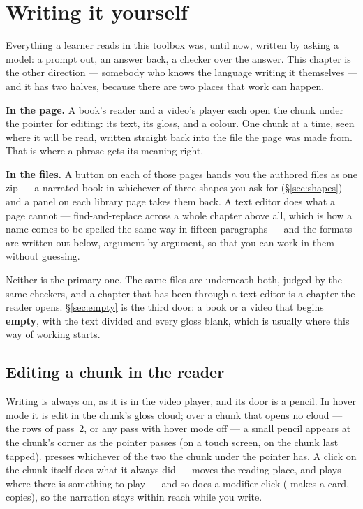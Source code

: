 \documentclass[11pt,oneside]{report}
\newcommand{\key}[1]{\textsf{\small\fbox{#1}}}
\newcommand{\menu}[1]{\textsf{#1}}
\begin{document}
\chapter{Writing it yourself}
\label{ch:writing}

Everything a learner reads in this toolbox was, until now, written by asking a
model: a prompt out, an answer back, a checker over the answer. This chapter
is the other direction --- somebody who knows the language writing it
themselves --- and it has two halves, because there are two places that work
can happen.

\textbf{In the page.} A book's reader and a video's player each open the chunk
under the pointer for editing: its text, its gloss, and a colour. One chunk at
a time, seen where it will be read, written straight back into the file the
page was made from. That is where a phrase gets its meaning right.

\textbf{In the files.} A button on each of those pages hands you the authored
files as one zip --- a narrated book in whichever of three shapes you ask for
(\S\ref{sec:shapes}) --- and a panel on each library page takes them back. A text
editor does what a page cannot --- find-and-replace across a whole chapter
above all, which is how a name comes to be spelled the same way in fifteen
paragraphs --- and the formats are written out below, argument by argument, so
that you can work in them without guessing.

Neither is the primary one. The same files are underneath both, judged by the
same checkers, and a chapter that has been through a text editor is a chapter
the reader opens. \S\ref{sec:empty} is the third door: a book or a video that
begins \textbf{empty}, with the text divided and every gloss blank, which is
usually where this way of working starts.

\section{Editing a chunk in the reader}
\label{sec:editchunk}

Writing is always on, as it is in the video player, and its door is a
pencil. In hover mode it is \menu{edit} in the chunk's gloss cloud; over a
chunk that opens no cloud --- the rows of pass~2, or any pass with hover mode
off --- a small pencil appears at the chunk's corner as the pointer passes (on
a touch screen, on the chunk last tapped). \key{E} presses whichever of the
two the chunk under the pointer has. A click on the chunk itself does what it
always did --- moves the reading place, and plays where there is something to
play --- and so does a modifier-click (\key{alt} makes a card, \key{shift}
copies), so the narration stays within reach while you write.
\end{document}
